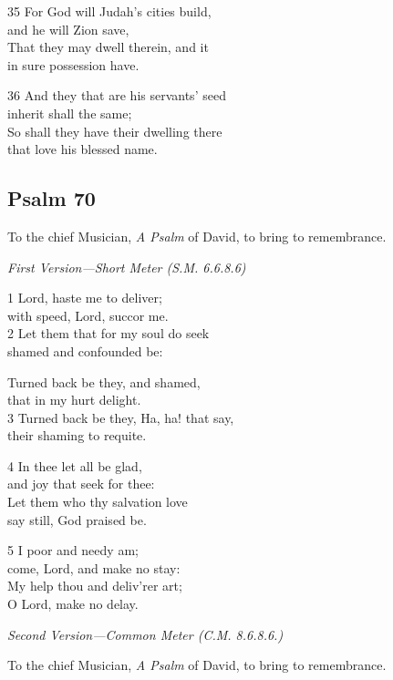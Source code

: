 \begin{multicols}{3}
35 For God will Judah’s cities build,\\
and he will Zion save,\\
That they may dwell therein, and it\\
in sure possession have.

36 And they that are his servants’ seed\\
inherit shall the same;\\
So shall they have their dwelling there\\
that love his blessed name.

\begin{center}
\quad{}\quad{}
\end{center}

\subsection*{Psalm 70}

To the chief Musician,
\emph{A Psalm} of David, to bring to remembrance.

\emph{First Version---Short Meter (S.M. 6.6.8.6)}

1 Lord, haste me to deliver;\\
with speed, Lord, succor me.\\
2 Let them that for my soul do seek\\
shamed and confounded be:

Turned back be they, and shamed,\\
that in my hurt delight.\\
3 Turned back be they, Ha, ha! that say,\\
their shaming to requite.

4 In thee let all be glad,\\
and joy that seek for thee:\\
Let them who thy salvation love\\
say still, God praised be.

5 I poor and needy am;\\
come, Lord, and make no stay:\\
My help thou and deliv’rer art;\\
O Lord, make no delay.

\emph{Second Version---Common Meter (C.M. 8.6.8.6.)}

To the chief Musician,
\emph{A Psalm} of David, to bring to remembrance.


\end{multicols}
